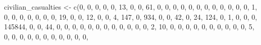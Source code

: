 \documentclass[
]{book}
\newenvironment{Shaded}{\begin{snugshade}}{\end{snugshade}}
\newcommand{\DecValTok}[1]{\textcolor[rgb]{0.00,0.00,0.81}{#1}}
\newcommand{\FunctionTok}[1]{\textcolor[rgb]{0.00,0.00,0.00}{#1}}
\newcommand{\NormalTok}[1]{#1}
\newcommand{\OtherTok}[1]{\textcolor[rgb]{0.56,0.35,0.01}{#1}}
\begin{document}
\begin{Shaded}
\begin{Highlighting}[]
\NormalTok{civilian\_casualties }\OtherTok{\textless{}{-}} \FunctionTok{c}\NormalTok{(}\DecValTok{0}\NormalTok{, }\DecValTok{0}\NormalTok{, }\DecValTok{0}\NormalTok{, }\DecValTok{0}\NormalTok{, }\DecValTok{0}\NormalTok{, }\DecValTok{13}\NormalTok{, }\DecValTok{0}\NormalTok{, }\DecValTok{0}\NormalTok{, }\DecValTok{61}\NormalTok{, }\DecValTok{0}\NormalTok{, }\DecValTok{0}\NormalTok{, }\DecValTok{0}\NormalTok{, }\DecValTok{0}\NormalTok{, }\DecValTok{0}\NormalTok{, }\DecValTok{0}\NormalTok{, }\DecValTok{0}\NormalTok{, }\DecValTok{0}\NormalTok{,}
                          \DecValTok{0}\NormalTok{, }\DecValTok{0}\NormalTok{, }\DecValTok{0}\NormalTok{, }\DecValTok{0}\NormalTok{, }\DecValTok{1}\NormalTok{, }\DecValTok{0}\NormalTok{, }\DecValTok{0}\NormalTok{, }\DecValTok{0}\NormalTok{, }\DecValTok{0}\NormalTok{, }\DecValTok{0}\NormalTok{, }\DecValTok{0}\NormalTok{, }\DecValTok{0}\NormalTok{, }\DecValTok{19}\NormalTok{, }\DecValTok{0}\NormalTok{, }\DecValTok{0}\NormalTok{, }\DecValTok{12}\NormalTok{, }\DecValTok{0}\NormalTok{, }\DecValTok{0}\NormalTok{, }\DecValTok{4}\NormalTok{, }\DecValTok{147}\NormalTok{, }\DecValTok{0}\NormalTok{, }\DecValTok{934}\NormalTok{, }\DecValTok{0}\NormalTok{, }\DecValTok{0}\NormalTok{,}
                          \DecValTok{42}\NormalTok{, }\DecValTok{0}\NormalTok{, }\DecValTok{24}\NormalTok{, }\DecValTok{124}\NormalTok{, }\DecValTok{0}\NormalTok{, }\DecValTok{1}\NormalTok{, }\DecValTok{0}\NormalTok{, }\DecValTok{0}\NormalTok{, }\DecValTok{0}\NormalTok{, }\DecValTok{145844}\NormalTok{, }\DecValTok{0}\NormalTok{, }\DecValTok{0}\NormalTok{, }\DecValTok{44}\NormalTok{, }\DecValTok{0}\NormalTok{, }\DecValTok{0}\NormalTok{, }\DecValTok{0}\NormalTok{, }\DecValTok{0}\NormalTok{, }\DecValTok{0}\NormalTok{, }\DecValTok{0}\NormalTok{, }\DecValTok{0}\NormalTok{, }\DecValTok{0}\NormalTok{, }\DecValTok{0}\NormalTok{, }\DecValTok{0}\NormalTok{,}
                          \DecValTok{0}\NormalTok{, }\DecValTok{0}\NormalTok{, }\DecValTok{2}\NormalTok{, }\DecValTok{10}\NormalTok{, }\DecValTok{0}\NormalTok{, }\DecValTok{0}\NormalTok{, }\DecValTok{0}\NormalTok{, }\DecValTok{0}\NormalTok{, }\DecValTok{0}\NormalTok{, }\DecValTok{0}\NormalTok{, }\DecValTok{0}\NormalTok{, }\DecValTok{0}\NormalTok{, }\DecValTok{0}\NormalTok{, }\DecValTok{0}\NormalTok{, }\DecValTok{5}\NormalTok{, }\DecValTok{0}\NormalTok{, }\DecValTok{0}\NormalTok{, }\DecValTok{0}\NormalTok{, }\DecValTok{0}\NormalTok{, }\DecValTok{0}\NormalTok{, }\DecValTok{0}\NormalTok{, }\DecValTok{0}\NormalTok{, }\DecValTok{0}\NormalTok{, }\DecValTok{0}\NormalTok{, }\DecValTok{0}\NormalTok{, }\DecValTok{0}\NormalTok{,}

\end{Highlighting}
\end{Shaded}
\end{document}
